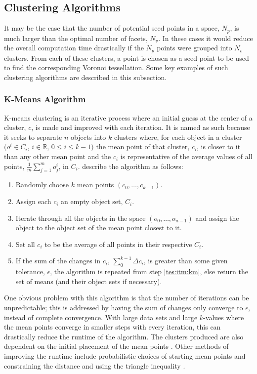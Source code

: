 \subsection{Clustering Algorithms} \label{tes:sec:clu}
It may be the case that the number of potential seed points in a space, $N_p$, is much larger than the optimal number of facets, $N_v$. In these cases it would reduce the overall computation time drastically if the $N_p$ points were grouped into $N_v$ clusters. From each of these clusters, a point is chosen as a seed point to be used to find the corresponding Voronoi tessellation. Some key examples of such clustering algorithms are described in this subsection.
%
\subsubsection{K-Means Algorithm}\label{tes:ssec:kma}
K-means clustering is an iterative process where an initial guess at the center of a cluster, $c$, is made and improved with each iteration. It is named as such because it seeks to separate $n$ objects into $k$ clusters where, for each object in a cluster $( o^i \in C_i$, $i \in \mathbb{R}$, $0\leq i \leq k-1)$ the mean point of that cluster, $c_i$, is closer to it than any other mean point and the $c_i$ is representative of the average values of all points, $\frac{1}{m}\sum^m_{j=1}o^i_j$, in $C_i$. \citet{way2012advances} describe the algorithm as follows:
\begin{enumerate}
  \item	Randomly choose $k$ mean points $(c_0,\dots,c_{k-1})$.
  \item\label{tes:itm:km} Assign each $c_i$ an empty object set, $C_i$.
  \item Iterate through all the objects in the space $(o_0,\dots,o_{n-1})$ and assign the object to the object set of the mean point closest to it.
  \item Set all $c_i$ to be the average of all points in their respective $C_i$.
  \item If the sum of the changes in $c_i$, $\sum_0^{k-1} \Delta c_i$, is greater than some given tolerance, $\epsilon$, the algorithm is repeated from step \ref{tes:itm:km}, else return the set of means (and their object sets if 	      necessary).
\end{enumerate}
One obvious problem with this algorithm is that the number of iterations can be unpredictable; this is addressed by having the sum of changes only converge to $\epsilon$, instead of complete convergence. With large data sets and large $k$-values where the mean points converge in smaller steps with every iteration, this can drastically reduce the runtime of the algorithm. The clusters produced are also dependent on the initial placement of the mean points \citep{way2012advances}. Other methods of improving the runtime include probabilistic choices of starting mean points \citep{arthur2007k} and constraining the distance and using the triangle inequality \citep{hamerly2010making}.
%
